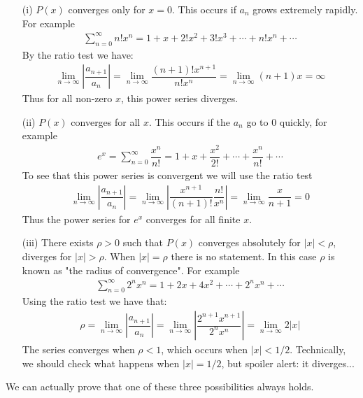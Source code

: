     \begin{enumerate}
      \item[(i)] 
        $P(x)$ converges only for $x = 0$. This occurs if $a_n$ grows extremely rapidly. For
        example\\
        \begin{align*}
          \sum_{n=0}^{\infty} n!x^n = 1 + x + 2!x^2 + 3!x^3 + \cdots + n!x^n + \cdots
        \end{align*}
        By the ratio test we have:
        \begin{align*}
          \lim_{n \to \infty} \left|\dfrac{a_{n+1}}{a_n}\right| 
          = \lim_{n \to \infty} \dfrac{(n+1)!x^{n+1}}{n!x^n} 
          = \lim_{n \to \infty} (n+1)x  = \infty
        \end{align*}
        Thus for all non-zero $x$, this power series diverges.
      \item[(ii)] 
        $P(x)$ converges for all $x$. This occurs if the $a_n$ go to 0 quickly, for example
        \begin{align*}
          e^x = \sum_{n=0}^{\infty} \dfrac{x^n}{n!} = 1 + x + \dfrac{x^2}{2!} + \cdots + 
                                                                       \dfrac{x^n}{n!} + \cdots
        \end{align*}
        To see that this power series is convergent we will use the ratio test
        \begin{align*}
          \lim_{n \to \infty} \left|\dfrac{a_{n+1}}{a_n}\right| 
          = \lim_{n \to \infty} \left|\dfrac{x^{n+1}}{(n+1)!}\dfrac{n!}{x^n}\right|
          = \lim_{n \to \infty} \dfrac{x}{n+1} = 0 
        \end{align*}
        Thus the power series for $e^x$ converges for all finite $x$.
      \item[(iii)] 
        There exists $\rho > 0$ such that $P(x)$ converges absolutely for $|x| < \rho$,
        diverges for $|x| > \rho$. When $|x| = \rho$ there is no statement. In this case 
        $\rho$ is known as "the radius of convergence". For example
        \begin{align*}
          \sum_{n=0}^{\infty} 2^nx^n = 1 + 2x + 4x^2 + \cdots + 2^nx^n + \cdots
        \end{align*}
        Using the ratio test we have that:
        \begin{align*}
          \rho = \lim_{n \to \infty} \left|\dfrac{a_{n+1}}{a_n}\right| 
          = \lim_{n \to \infty} \left|\dfrac{2^{n+1} x^{n+1}}{2^nx^n}\right|
          = \lim_{n \to \infty} 2|x|
        \end{align*}
         The series converges when $\rho < 1$, which occurs when $|x| < 1/2$. Technically,
         we should check what happens when $|x| = 1/2$, but spoiler alert: it diverges...
    \end{enumerate}
    
    We can actually prove that one of these three possibilities always holds.\\

    \pf {}
